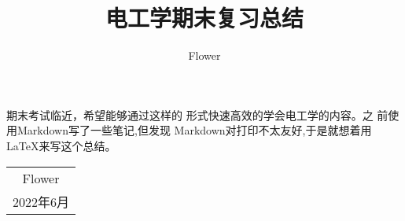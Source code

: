\documentclass{ctexart}%
\date{}
\title{电工学期末复习总结}
\author{Flower}
\begin{document}
\maketitle
\begin{center}
    期末考试临近，希望能够通过这样的
形式快速高效的学会电工学的内容。之
前使用Markdown写了一些笔记,但发现
Markdown对打印不太友好,于是就想着用
\LaTeX{}来写这个总结。
\end{center}
\begin{flushright}
    \begin{tabular}{c}
        Flower\\
        2022年6月
    \end{tabular}
\end{flushright}

\newpage
\tableofcontents
\newpage








\newpage
\end{document}
